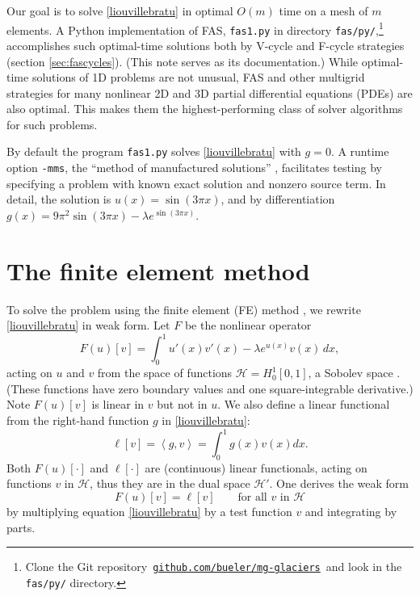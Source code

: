 \documentclass[letterpaper,final,12pt,reqno]{amsart}
\newcommand{\ip}[2]{\left<#1,#2\right>}
\begin{document}
Our goal is to solve \eqref{liouvillebratu} in optimal $O(m)$ time on a mesh of $m$ elements.  A Python implementation of FAS, \texttt{fas1.py} in directory \texttt{fas/py/},\footnote{Clone the Git repository\, \href{https://github.com/bueler/mg-glaciers}{\texttt{github.com/bueler/mg-glaciers}}\, and look in the \texttt{fas/py/} directory.} accomplishes such optimal-time solutions both by V-cycle and F-cycle strategies (section \ref{sec:fascycles}).  (This note serves as its documentation.)  While optimal-time solutions of 1D problems are not unusual, FAS and other multigrid strategies for many nonlinear 2D and 3D partial differential equations (PDEs) are also optimal.  This makes them the highest-performing class of solver algorithms for such problems.

By default the program \texttt{fas1.py} solves \eqref{liouvillebratu} with $g=0$.  A runtime option \texttt{-mms}, the ``method of manufactured solutions'' \cite{Bueler2021}, facilitates testing by specifying a problem with known exact solution and nonzero source term.  In detail, the solution is $u(x)=\sin(3\pi x)$, and by differentiation $g(x)=9\pi^2 \sin(3\pi x) - \lambda e^{\sin(3\pi x)}$.


\section{The finite element method}  \label{sec:femethod}

To solve the problem using the finite element (FE) method \cite{Braess2007,Bueler2021,Elmanetal2014}, we rewrite \eqref{liouvillebratu} in weak form.  Let $F$ be the nonlinear operator
\begin{equation}
  F(u)[v] = \int_0^1 u'(x) v'(x) - \lambda e^{u(x)} v(x)\, dx,  \label{operator}
\end{equation}
acting on $u$ and $v$ from the space of functions $\mathcal{H}=H_0^1[0,1]$, a Sobolev space \cite{Evans2010}.  (These functions have zero boundary values and one square-integrable derivative.)  Note $F(u)[v]$ is linear in $v$ but not in $u$.  We also define a linear functional from the right-hand function $g$ in \eqref{liouvillebratu}:
\begin{equation}
  \ell[v] = \ip{g}{v} = \int_0^1 g(x) v(x) dx.  \label{rhsfunctional}
\end{equation}
Both $F(u)[\cdot]$ and $\ell[\cdot]$ are (continuous) linear functionals, acting on functions $v$ in $\mathcal{H}$, thus they are in the dual space $\mathcal{H}'$.  One derives the weak form
\begin{equation}
  F(u)[v] = \ell[v] \qquad \text{for all $v$ in $\mathcal{H}$} \label{weakform}
\end{equation}
by multiplying equation \eqref{liouvillebratu} by a test function $v$ and integrating by parts.
\end{document}
